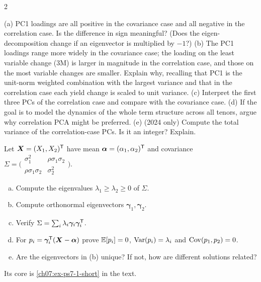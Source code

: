 \begin{paracol}{2}
\begin{exercise}
(a) PC1 loadings are all positive in the covariance case and all negative in the correlation case. Is the
difference in sign meaningful? (Does the eigen-decomposition change if an eigenvector is multiplied by $-1$?)
(b) The PC1 loadings range more widely in the covariance case; the loading on the least variable change (3M) is
larger in magnitude in the correlation case, and those on the most variable changes are smaller. Explain why,
recalling that PC1 is the unit-norm weighted combination with the largest variance and that in the correlation
case each yield change is scaled to unit variance.
(c) Interpret the first three PCs of the correlation case and compare with the covariance case.
(d) If the goal is to model the dynamics of the whole term structure across all tenors, argue why correlation PCA
might be preferred.
(e) (2024 only) Compute the total variance of the correlation-case PCs. Is it an integer? Explain.
\end{exercise}

\begin{exercise}\label{ch07:ex-ps7-1}
Let $\bm X=(X_1,X_2)^{\mathsf T}$ have mean $\bm\alpha=(\alpha_1,\alpha_2)^{\mathsf T}$ and covariance
$\Sigma=\bigl(\begin{smallmatrix}\sigma_1^2&\rho\sigma_1\sigma_2\\ \rho\sigma_1\sigma_2&\sigma_2^2\end{smallmatrix}\bigr)$.
\begin{enumerate}[(a)]
  \item Compute the eigenvalues $\lambda_1\ge\lambda_2\ge0$ of $\Sigma$.
  \item Compute orthonormal eigenvectors $\bm\gamma_1,\bm\gamma_2$.
  \item Verify $\Sigma=\sum_i\lambda_i\bm\gamma_i\bm\gamma_i^{\mathsf T}$.
  \item For $p_i=\bm\gamma_i^{\mathsf T}(\bm X-\bm\alpha)$ prove $\mathbb{E}[p_i]=0$, $\operatorname{Var}(p_i)=\lambda_i$ and $\operatorname{Cov}(p_1,p_2)=0$.
  \item Are the eigenvectors in (b) unique? If not, how are different solutions related?
\end{enumerate}
Its core is \cref{ch07:ex-ps7-1-short} in the text.
\end{exercise}


\end{paracol}
